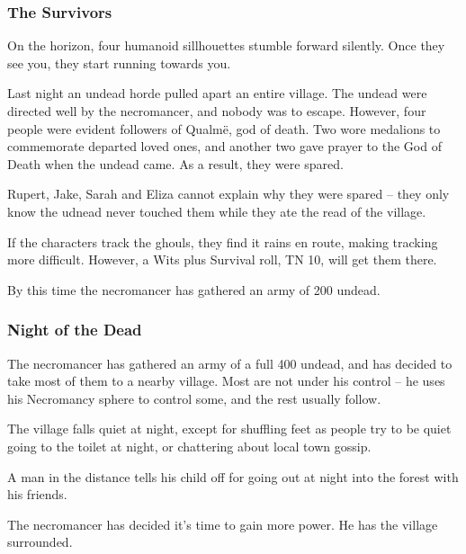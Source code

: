 
\ghoul

\subsubsection{The Survivors}

\begin{boxtext}
	On the horizon, four humanoid sillhouettes stumble forward silently.  Once they see you, they start running towards you.
\end{boxtext}

Last night an undead horde pulled apart an entire village.  The undead were directed well by the necromancer, and nobody was to escape.  However, four people were evident followers of Qualm\"{e}, god of death.  Two wore medalions to commemorate departed loved ones, and another two gave prayer to the God of Death when the undead came.  As a result, they were spared.

Rupert, Jake, Sarah and Eliza cannot explain why they were spared -- they only know the udnead never touched them while they ate the read of the village.

If the characters track the ghouls, they find it rains en route, making tracking more difficult.  However, a Wits plus Survival roll, TN 10, will get them there.

By this time the necromancer has gathered an army of 200 undead.

\subsubsection{Night of the Dead}

The necromancer has gathered an army of a full 400 undead, and has decided to take most of them to a nearby village.  Most are not under his control -- he uses his Necromancy sphere to control some, and the rest usually follow.

\begin{boxtext}
	The village falls quiet at night, except for shuffling feet as people try to be quiet going to the toilet at night, or chattering about local town gossip.

	A man in the distance tells his child off for going out at night into the forest with his friends.
\end{boxtext}

The necromancer has decided it's time to gain more power.  He has the village surrounded.

